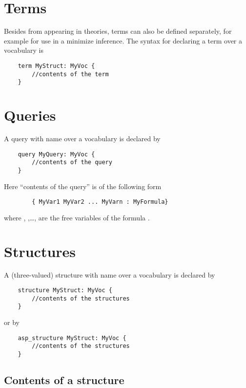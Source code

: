 \documentclass[a4]{article}
\begin{document}
\section{Terms}
Besides from appearing in theories, terms can also be defined separately, for example for use in a minimize inference. The syntax for declaring a term  over a vocabulary  is
\begin{lstlisting}
	term MyStruct: MyVoc {
		//contents of the term
	}
\end{lstlisting}

\section{Queries}

A query with name  over a vocabulary  is declared by
\begin{lstlisting}
	query MyQuery: MyVoc {
		//contents of the query
	}
\end{lstlisting}
Here ``contents of the query'' is of the following form 
\begin{lstlisting}
		{ MyVar1 MyVar2 ... MyVarn : MyFormula}
\end{lstlisting}
where , ,\ldots, are the free variables of the \fodot formula .


\section{Structures}

A (three-valued) structure with name  over a vocabulary  is declared by
\begin{lstlisting}
	structure MyStruct: MyVoc {
		//contents of the structures
	}
\end{lstlisting}
or by 
\begin{lstlisting}
	asp_structure MyStruct: MyVoc {
		//contents of the structures
	}
\end{lstlisting}

\subsection{Contents of a structure}
\end{document}
